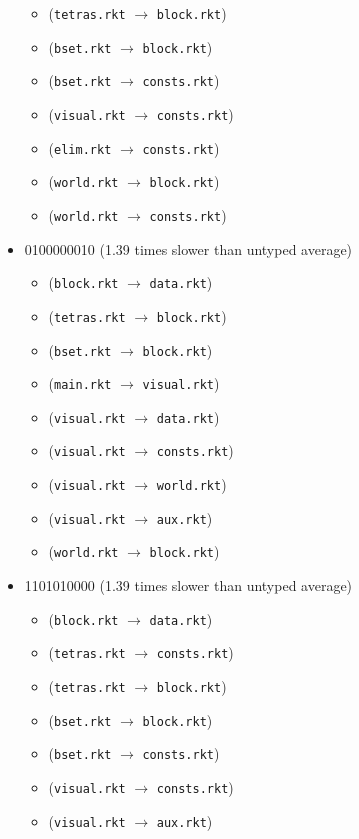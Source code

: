\documentclass{article}
\newcommand{\mono}[1]{\texttt{#1}}
\begin{document}
\begin{itemize}
\begin{itemize}
  \item (\mono{tetras.rkt} $\rightarrow$ \mono{block.rkt})
  \item (\mono{bset.rkt} $\rightarrow$ \mono{block.rkt})
  \item (\mono{bset.rkt} $\rightarrow$ \mono{consts.rkt})
  \item (\mono{visual.rkt} $\rightarrow$ \mono{consts.rkt})
  \item (\mono{elim.rkt} $\rightarrow$ \mono{consts.rkt})
  \item (\mono{world.rkt} $\rightarrow$ \mono{block.rkt})
  \item (\mono{world.rkt} $\rightarrow$ \mono{consts.rkt})
  \end{itemize}
\item 0100000010 (1.39 times slower than untyped average)
  \begin{itemize}
  \item (\mono{block.rkt} $\rightarrow$ \mono{data.rkt})
  \item (\mono{tetras.rkt} $\rightarrow$ \mono{block.rkt})
  \item (\mono{bset.rkt} $\rightarrow$ \mono{block.rkt})
  \item (\mono{main.rkt} $\rightarrow$ \mono{visual.rkt})
  \item (\mono{visual.rkt} $\rightarrow$ \mono{data.rkt})
  \item (\mono{visual.rkt} $\rightarrow$ \mono{consts.rkt})
  \item (\mono{visual.rkt} $\rightarrow$ \mono{world.rkt})
  \item (\mono{visual.rkt} $\rightarrow$ \mono{aux.rkt})
  \item (\mono{world.rkt} $\rightarrow$ \mono{block.rkt})
  \end{itemize}
\item 1101010000 (1.39 times slower than untyped average)
  \begin{itemize}
  \item (\mono{block.rkt} $\rightarrow$ \mono{data.rkt})
  \item (\mono{tetras.rkt} $\rightarrow$ \mono{consts.rkt})
  \item (\mono{tetras.rkt} $\rightarrow$ \mono{block.rkt})
  \item (\mono{bset.rkt} $\rightarrow$ \mono{block.rkt})
  \item (\mono{bset.rkt} $\rightarrow$ \mono{consts.rkt})
  \item (\mono{visual.rkt} $\rightarrow$ \mono{consts.rkt})
  \item (\mono{visual.rkt} $\rightarrow$ \mono{aux.rkt})

\end{itemize}
\end{itemize}
\end{document}
